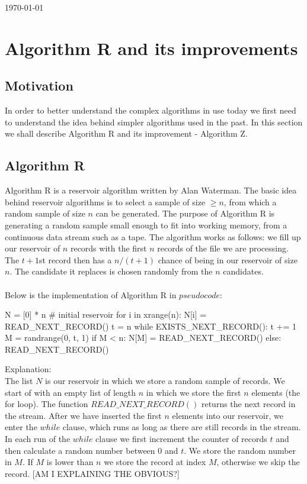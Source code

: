 \documentclass[journal]{IEEEtran/IEEEtran}
\begin{document}
 
\hfill \today
\section{Algorithm R and its improvements}
\subsection{Motivation}
In order to better understand the complex algorithms in use today we first need to understand the idea behind simpler algorithms used in the past. In this section we shall describe Algorithm R and its improvement - Algorithm Z.

\subsection{Algorithm R}
Algorithm R is a reservoir algorithm written by Alan Waterman. The basic idea behind reservoir algorithms is to select a sample of size $\ge n$, from which a random sample of size $n$ can be generated. The purpose of Algorithm R is generating a random sample small enough to fit into working memory, from a continuous data stream such as a tape. The algorithm works as follows: we fill up our reservoir of $n$ records with the first $n$ records of the file we are processing. The $t + 1$st record then has a $n/(t + 1)$ chance of being in our reservoir of size $n$. The candidate it replaces is chosen randomly from the $n$ candidates.
\\\\
Below is the implementation of Algorithm R in $pseudo code$:\\
\begin{code}
N = [0] * n # initial reservoir
for i in xrange(n):
	N[i] = READ_NEXT_RECORD()
t = n
while EXISTS_NEXT_RECORD():
	t += 1
	M = randrange(0, t, 1)
	if M < n:
		N[M] = READ_NEXT_RECORD()
	else:
		READ_NEXT_RECORD()	

\end{code}
Explanation:\\
The list $N$ is our reservoir in which we store a random sample of records. We start of with an empty list of length $n$ in which we store the first $n$ elements (the for loop). The function $READ\_NEXT\_RECORD()$ returns the next record in the stream. After we have inserted the first $n$ elements into our reservoir, we enter the $while$ clause, which runs as long as there are still records in the stream. In each run of the $while$ clause we first increment the counter of records $t$ and then calculate a random number between $0$ and $t$. We store the random number in $M$. If $M$ is lower than $n$ we store the record at index $M$, otherwise we skip the record. [AM I EXPLAINING THE OBVIOUS?]
\end{document}
